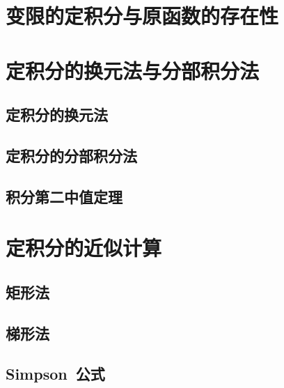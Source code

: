 \section{变限的定积分与原函数的存在性}
\begin{exercise}
\item
\end{exercise}
\section{定积分的换元法与分部积分法}
\subsection{定积分的换元法}
\subsection{定积分的分部积分法}
\subsection{积分第二中值定理}
\begin{exercise}
\item
\end{exercise}
\section{定积分的近似计算}
\subsection{矩形法}
\subsection{梯形法}
\subsection{Simpson~公式}
\begin{exercise}
\item
\end{exercise}
\begin{exercise*}
\item
\end{exercise*}




\endinput
